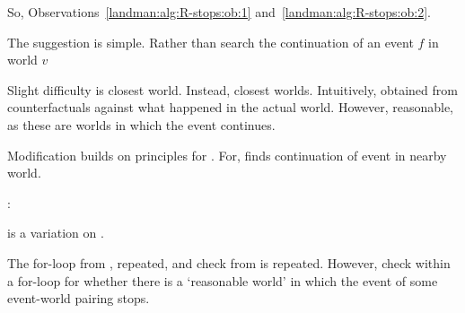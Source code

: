 \begin{note}
  So, Observations~\ref{landman:alg:R-stops:ob:1} and~\ref{landman:alg:R-stops:ob:2}.

  The suggestion is simple.
  Rather than search the continuation of an event \(f\) in world \(v\) 

  Slight difficulty is closest world.
  Instead, closest worlds.
  Intuitively, obtained from counterfactuals against what happened in the actual world.
  However, reasonable, as these are worlds in which the event continues.
\end{note}

\begin{note}
  Modification builds on principles for \AlgFindBranches{}.
  For, \AlgFindBranches{} finds continuation of event in nearby world.


  \AlgGetPStops{}:

  \begin{algorithm}[H]
    \label{PrAl:g-s}
    \caption{\AlgGetPStops{}}
    \SetAlgoLined
    \DontPrintSemicolon
  \end{algorithm}

  \AlgGetPStops{} is a variation on \AlgGetStops{}.

  The for-loop from \AlgGetStops{}, repeated, and check from \AlgGetStops{} is repeated.
  However, check within a for-loop for whether there is a `reasonable world' in which the event of some event-world pairing stops.
\end{note}

